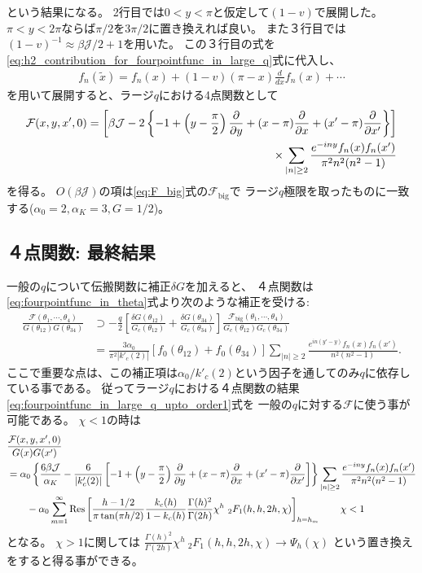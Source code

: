 という結果になる。
2行目では$0 < y < \pi$と仮定して$(1 - v)$で展開した。
$\pi < y < 2\pi$ならば$\pi / 2$を$3\pi / 2$に置き換えれば良い。
また３行目では$(1-v)^{-1}\approx \beta\mathcal{J}/2 + 1$を用いた。
この３行目の式を\eqref{eq:h2_contribution_for_fourpointfunc_in_large_q}式に代入し、
\begin{align}
	f_n(\tilde{x}) = f_n(x) + (1-v)(\pi - x)\frac{d}{dx}f_n(x) + \cdots
\end{align}
を用いて展開すると、ラージ$q$における4点関数として
\begin{align}
	\mathcal{F}(x, y, x', 0)
	= \left[
		\beta\mathcal{J} - 2\left\{-1 + \left(y - \frac{\pi}{2}\right)\frac{\partial}{\partial y}
		+ (x-\pi)\frac{\partial}{\partial x} + (x' - \pi)\frac{\partial}{\partial x'}\right\}
	\right]\nonumber\\
	\times \sum_{|n|\geq 2} \frac{e^{-iny}f_n(x)f_n(x')}{\pi^2n^2(n^2-1)}
	\label{eq:fourpointfunc_in_large_q_upto_order1}
\end{align}
を得る。
$O(\beta\mathcal{J})$の項は\eqref{eq:F_big}式の$\mathcal{F}_{\mathrm{big}}$で
ラージ$q$極限を取ったものに一致する($\alpha_0=2, \alpha_K=3, G=1/2$)。

\subsection{４点関数: 最終結果}
一般の$q$について伝搬関数に補正$\delta G$を加えると、
４点関数は\eqref{eq:fourpointfunc_in_theta}式より次のような補正を受ける:
\begin{align}
	\frac{\mathcal{F}(\theta_1, \cdots, \theta_4)}{G(\theta_{12})G(\theta_{34})}
	&\supset -\frac{q}{2}
		\left[
			\frac{\delta G(\theta_{12})}{G_c(\theta_{12})}
			+ \frac{\delta G(\theta_{34})}{G_c(\theta_{34})}
		\right]
		\frac{\mathcal{F}_{\mathrm{big}}(\theta_1, \cdots, \theta_4)}
			{G_c(\theta_{12})G_c(\theta_{34})}\\
	&= \frac{3\alpha_0}{\pi^2|k'_c(2)|}[f_0(\theta_{12}) + f_0(\theta_{34})]
		\sum_{|n|\geq 2}\frac{e^{in(y'-y)}f_n(x)f_n(x')}{n^2(n^2-1)}.
\end{align}
ここで重要な点は、この補正項は$\alpha_0 / k'_c(2)$という因子を通してのみ$q$に依存している事である。
従ってラージ$q$における４点関数の結果\eqref{eq:fourpointfunc_in_large_q_upto_order1}式を
一般の$q$に対する$\mathcal{F}$に使う事が可能である。
$\chi < 1$の時は
\begin{align}
	&\frac{\mathcal{F}(x,y,x',0)}{G(x)G(x')}\nonumber\\
	&= \alpha_0\left\{
		\frac{6\beta\mathcal{J}}{\alpha_K} - \frac{6}{|k'_c(2)|}
		\left[
			-1 + \left(y-\frac{\pi}{2}\right)\frac{\partial}{\partial y}
			+ (x - \pi)\frac{\partial}{\partial x} + (x' - \pi)\frac{\partial}{\partial x'}
		\right]
	\right\}\sum_{|n|\geq 2}\frac{e^{-iny}f_n(x)f_n(x')}{\pi^2n^2(n^2-1)}\nonumber\\
	&\hspace{20pt}
	-\alpha_0\sum_{m=1}^{\infty}\mathrm{Res}\left[
		\frac{h-1/2}{\pi\tan(\pi h/2)}\frac{k_c(h)}{1-k_c(h)}\frac{\Gamma(h)^2}{\Gamma(2h)}
		\chi^h\ {}_2F_1(h, h, 2h, \chi)
	\right]_{h=h_m}
	\hspace{20pt}\chi < 1
\end{align}
となる。
$\chi > 1$に関しては
$\frac{\Gamma(h)^2}{\Gamma(2h)}\chi^h\ {}_2F_1(h, h, 2h, \chi)\to \Psi_h(\chi)$
という置き換えをすると得る事ができる。

\pagebreak
